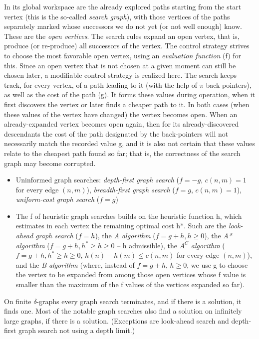 \documentclass[margin=0px]{article}
\begin{document}
In its global workspace are the already explored paths starting from the start vertex (this is the so-called \textit{search graph}), with those vertices of the paths separately marked whose successors we do not yet (or not well enough) know. These are the \textit{open vertices}. The search rules expand an open vertex, that is, produce (or re-produce) all successors of the vertex. The control strategy strives to choose the most favorable open vertex, using an \textit{evaluation function} (f) for this. Since an open vertex that is not chosen at a given moment can still be chosen later, a modifiable control strategy is realized here.
The search keeps track, for every vertex, of a path leading to it (with the help of \textbf{$\pi$} back-pointers), as well as the cost of the path (g). It forms these values during operation, when it first discovers the vertex or later finds a cheaper path to it. In both cases (when these values of the vertex have changed) the vertex becomes open. When an already-expanded vertex becomes open again, then for its already-discovered descendants the cost of the path designated by the back-pointers will not necessarily match the recorded value g, and it is also not certain that these values relate to the cheapest path found so far; that is, the correctness of the search graph may become corrupted.
\begin{itemize}
    \item Uninformed graph searches: \textit{depth-first graph search} ($f = -g$, $c(n,m)=1$ for every edge $(n,m)$), \textit{breadth-first graph search} ($f = g$, $c(n,m)=1$), \textit{uniform-cost graph search} ($f = g$)
    \item The f of heuristic graph searches builds on the heuristic function h, which estimates in each vertex the remaining optimal cost h*. Such are the \textit{look-ahead graph search} ($f = h$), the \textit{A algorithm} ($f = g+h, h \geq 0$), the \textit{A* algorithm} ($f = g+h, h^* \geq h \geq 0$ -- h admissible), the \textit{$A^C$ algorithm} ($f = g+h, h^* \geq h \geq 0$, $h(n)-h(m) \leq c(n,m)$ for every edge $(n,m)$), and the \textit{B algorithm} (where, instead of $f= g+h$, $h \geq 0$, we use g to choose the vertex to be expanded from among those open vertices whose f value is smaller than the maximum of the f values of the vertices expanded so far).
\end{itemize}
On finite $\delta$-graphs every graph search terminates, and if there is a solution, it finds one. Most of the notable graph searches also find a solution on infinitely large graphs, if there is a solution. (Exceptions are look-ahead search and depth-first graph search not using a depth limit.)
\end{document}
